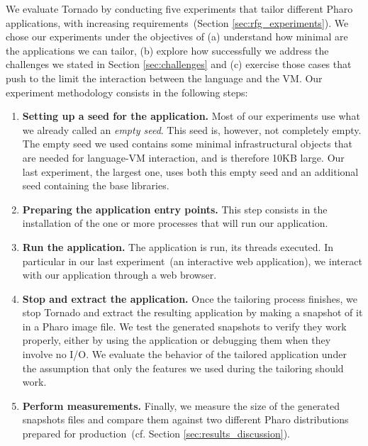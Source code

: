 \introduction

%
We evaluate Tornado by conducting five experiments that tailor different Pharo applications, with increasing requirements~(Section \ref{sec:rfg_experiments}). We chose our experiments under the objectives of (a) understand how minimal are the applications we can tailor, (b) explore how successfully we address the challenges we stated in Section \ref{sec:challenges} and (c) exercise those cases that push to the limit the interaction between the language and the VM. Our experiment methodology consists in the following steps:

\begin{enumerate}
\item \textbf{Setting up a seed for the application.} Most of our experiments use what we already called an \emph{empty seed}. This seed is, however, not completely empty. The empty seed we used contains some minimal infrastructural objects that are needed for language-VM interaction, and is therefore 10KB large. Our last experiment, the largest one, uses both this empty seed and an additional seed containing the base libraries. 
\item \textbf{Preparing the application entry points.} This step consists in the installation of the one or more processes that will run our application.
\item \textbf{Run the application.} The application is run, its threads executed. In particular in our last experiment~(an interactive web application), we interact with our application through a web browser. 
\item \textbf{Stop and extract the application.} Once the tailoring process finishes, we stop Tornado and extract the resulting application by making a snapshot of it in a Pharo image file. We test the generated snapshots to verify they work properly, either by using the application or debugging them when they involve no I/O. We evaluate the behavior of the tailored application under the assumption that only the features we used during the tailoring should work.
\item \textbf{Perform measurements.} Finally, we measure the size of the generated snapshots files and compare them against two different Pharo distributions prepared for production~(cf. Section \ref{sec:results_discussion}).
\end{enumerate}

